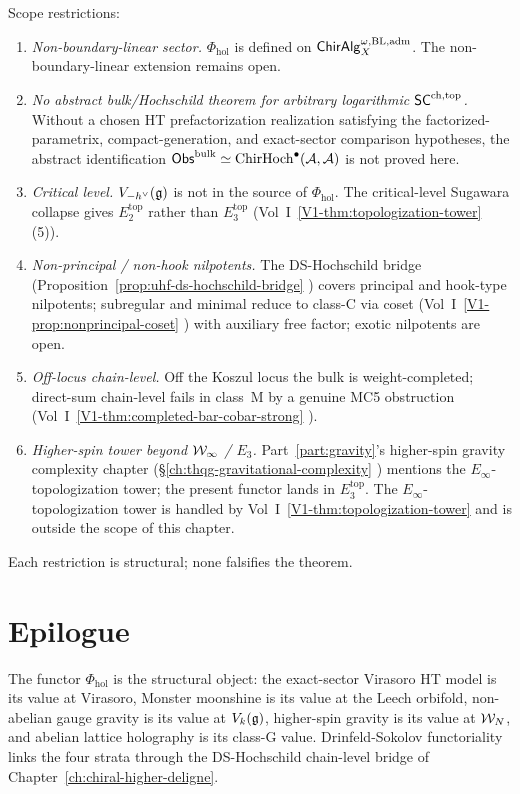 Scope restrictions:
\begin{enumerate}
\item \emph{Non-boundary-linear sector.}
 $\Phi_{\mathrm{hol}}$ is defined on
 $\mathsf{ChirAlg}^{\omega,\mathrm{BL,adm}}_X$. The non-boundary-linear
	 extension remains open.
\item \emph{No abstract bulk/Hochschild theorem for arbitrary
 logarithmic $\mathsf{SC}^{\mathrm{ch},\mathrm{top}}$.}
 Without a chosen HT prefactorization realization satisfying the
 factorized-parametrix, compact-generation, and exact-sector
 comparison hypotheses, the abstract identification
 $\mathsf{Obs}^{\mathrm{bulk}}\simeq\mathrm{ChirHoch}^\bullet(\mathcal{A},\mathcal{A})$ is not
 proved here.
\item \emph{Critical level.} $V_{-h^\vee}(\mathfrak{g})$ is not in the
 source of $\Phi_{\mathrm{hol}}$. The critical-level Sugawara
 collapse gives $E_2^{\mathrm{top}}$ rather than
 $E_3^{\mathrm{top}}$
 \textup{(}Vol~I~\ref*{V1-thm:topologization-tower}%
 \textup{(5)}\textup{)}.
\item \emph{Non-principal / non-hook nilpotents.} The
 DS-Hochschild bridge
 \textup{(}Proposition~\ref{prop:uhf-ds-hochschild-bridge}%
 \textup{)} covers principal and hook-type nilpotents; subregular
 and minimal reduce to class-C via coset
 \textup{(}Vol~I~\ref*{V1-prop:nonprincipal-coset}%
 \textup{)} with auxiliary free factor; exotic nilpotents are
 open.
\item \emph{Off-locus chain-level.} Off the Koszul locus the
 bulk is weight-completed; direct-sum chain-level fails in
 class~M by a genuine MC5 obstruction
 \textup{(}Vol~I~\ref*{V1-thm:completed-bar-cobar-strong}%
 \textup{)}.
\item \emph{Higher-spin tower beyond $\mathcal{W}_\infty$ / $E_3$.}
 Part~\ref*{part:gravity}'s higher-spin gravity complexity chapter
 \textup{(}\S\ref*{ch:thqg-gravitational-complexity}%
 \textup{)} mentions the $E_\infty$-topologization tower;
 the present functor lands in $E_3^{\mathrm{top}}$. The
 $E_\infty$-topologization tower is handled by
 Vol~I~\ref*{V1-thm:topologization-tower} and is
 outside the scope of this chapter.
\end{enumerate}

Each restriction is structural; none falsifies the theorem.

\section*{Epilogue}

The functor $\Phi_{\mathrm{hol}}$ is the structural object: the
exact-sector Virasoro HT model is its value at Virasoro, Monster
moonshine is its value at the Leech orbifold, non-abelian gauge gravity is its value at
$V_k(\mathfrak{g})$, higher-spin gravity is its value at $\mathcal{W}_N$, and abelian
lattice holography is its class-G value. Drinfeld-Sokolov
functoriality links the four strata through the DS-Hochschild
chain-level bridge of Chapter~\ref*{ch:chiral-higher-deligne}.

